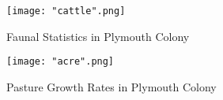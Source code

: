 \documentclass[sn-mathphys]{sn-jnl}%
\theoremstyle{thmstyleone}%
\theoremstyle{thmstyletwo}%
\theoremstyle{thmstylethree}%
\begin{document}
\begin{appendices}
\begin{landscape}
\begin{figure}[h]
\caption{Faunal Statistics in Plymouth Colony}
  \texttt{[image: "cattle".png]} 
\end{figure}

\begin{figure}[h]
\caption{Pasture Growth Rates in Plymouth Colony}
  \texttt{[image: "acre".png]} 
\end{figure}

\end{landscape}






\end{appendices}

\end{document}
